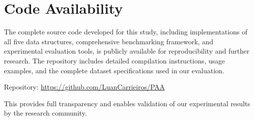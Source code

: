 \documentclass{sbc2023}
\begin{document}
\section*{Code Availability}
\label{sec:code_availability}

The complete source code developed for this study, including implementations of all five data structures, comprehensive benchmarking framework, and experimental evaluation tools, is publicly available for reproducibility and further research. The repository includes detailed compilation instructions, usage examples, and the complete dataset specifications used in our evaluation.

Repository: \url{https://github.com/LuanCarrieiros/PAA}

This provides full transparency and enables validation of our experimental results by the research community.



\end{document}
